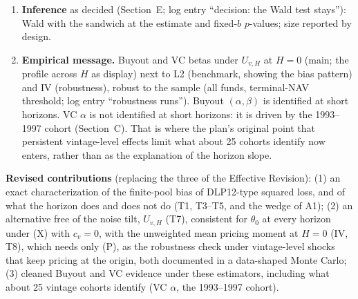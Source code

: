 \documentclass[11pt]{article}
\begin{document}
\begin{enumerate}
\item \textbf{Inference} as decided (Section~E; log entry ``decision: the Wald test stays''): Wald with the sandwich at the estimate and fixed-$b$ $p$-values; size reported by design.
\item \textbf{Empirical message.} Buyout and VC betas under $U_{v,H}$ at $H=0$ (main; the profile across $H$ as display) next to L2 (benchmark, showing the bias pattern) and IV (robustness), robust to the sample (all funds, terminal-NAV threshold; log entry ``robustness runs''). Buyout $(\alpha,\beta)$ is identified at short horizons. VC $\alpha$ is not identified at short horizons: it is driven by the 1993--1997 cohort (Section~C). That is where the plan's original point that persistent vintage-level effects limit what about 25 cohorts identify now enters, rather than as the explanation of the horizon slope.
\end{enumerate}

\textbf{Revised contributions} (replacing the three of the Effective Revision): (1) an exact characterization of the finite-pool bias of DLP12-type squared loss, and of what the horizon does and does not do (T1, T3--T5, and the wedge of A1); (2) an alternative free of the noise tilt, $U_{v,H}$ (T7), consistent for $\theta_0$ at every horizon under (X) with $c_v=0$, with the unweighted mean pricing moment at $H=0$ (IV, T8), which needs only (P), as the robustness check under vintage-level shocks that keep pricing at the origin, both documented in a data-shaped Monte Carlo; (3) cleaned Buyout and VC evidence under these estimators, including what about 25 vintage cohorts identify (VC $\alpha$, the 1993--1997 cohort).
\end{document}
